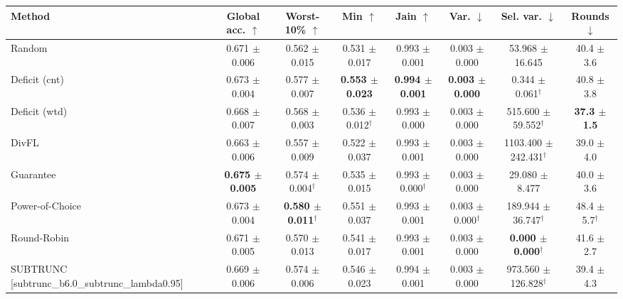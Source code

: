 \begin{tabular}{lccccccc}
\toprule
Method & Global acc. $\uparrow$ & Worst-10\% $\uparrow$ & Min $\uparrow$ & Jain $\uparrow$ & Var. $\downarrow$ & Sel. var. $\downarrow$ & Rounds $\downarrow$ \\
\midrule
Random & 0.671 $\pm$ 0.006 & 0.562 $\pm$ 0.015 & 0.531 $\pm$ 0.017 & 0.993 $\pm$ 0.001 & 0.003 $\pm$ 0.000 & 53.968 $\pm$ 16.645 & 40.4 $\pm$ 3.6 \\
Deficit (cnt) & 0.673 $\pm$ 0.004 & 0.577 $\pm$ 0.007 & \textbf{0.553 $\pm$ 0.023} & \textbf{0.994 $\pm$ 0.001} & \textbf{0.003 $\pm$ 0.000} & 0.344 $\pm$ 0.061$^\dagger$ & 40.8 $\pm$ 3.8 \\
Deficit (wtd) & 0.668 $\pm$ 0.007 & 0.568 $\pm$ 0.003 & 0.536 $\pm$ 0.012$^\dagger$ & 0.993 $\pm$ 0.000 & 0.003 $\pm$ 0.000 & 515.600 $\pm$ 59.552$^\dagger$ & \textbf{37.3 $\pm$ 1.5} \\
DivFL & 0.663 $\pm$ 0.006 & 0.557 $\pm$ 0.009 & 0.522 $\pm$ 0.037 & 0.993 $\pm$ 0.001 & 0.003 $\pm$ 0.000 & 1103.400 $\pm$ 242.431$^\dagger$ & 39.0 $\pm$ 4.0 \\
Guarantee & \textbf{0.675 $\pm$ 0.005} & 0.574 $\pm$ 0.004$^\dagger$ & 0.535 $\pm$ 0.015 & 0.993 $\pm$ 0.000$^\dagger$ & 0.003 $\pm$ 0.000 & 29.080 $\pm$ 8.477 & 40.0 $\pm$ 3.6 \\
Power-of-Choice & 0.673 $\pm$ 0.004 & \textbf{0.580 $\pm$ 0.011}$^\dagger$ & 0.551 $\pm$ 0.037 & 0.993 $\pm$ 0.001 & 0.003 $\pm$ 0.000$^\dagger$ & 189.944 $\pm$ 36.747$^\dagger$ & 48.4 $\pm$ 5.7$^\dagger$ \\
Round-Robin & 0.671 $\pm$ 0.005 & 0.570 $\pm$ 0.013 & 0.541 $\pm$ 0.017 & 0.993 $\pm$ 0.001 & 0.003 $\pm$ 0.000 & \textbf{0.000 $\pm$ 0.000}$^\dagger$ & 41.6 $\pm$ 2.7 \\
SUBTRUNC [subtrunc\_b6.0\_subtrunc\_lambda0.95] & 0.669 $\pm$ 0.006 & 0.574 $\pm$ 0.006 & 0.546 $\pm$ 0.023 & 0.994 $\pm$ 0.001 & 0.003 $\pm$ 0.000 & 973.560 $\pm$ 126.828$^\dagger$ & 39.4 $\pm$ 4.3 \\
\bottomrule
\end{tabular}
